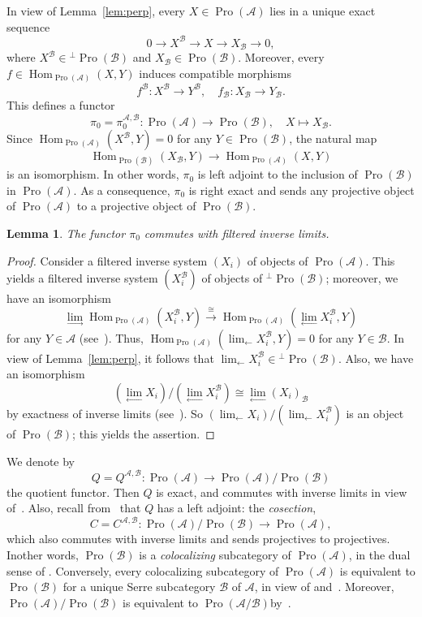 \documentclass[11pt]{article}
\newtheorem{lemm}[theo]{Lemma}
\theoremstyle{definition}
\numberwithin{equation}{section}
\newcommand\cA{{\mathcal A}}
\newcommand\cB{{\mathcal B}}
\DeclareMathOperator{\Hom}{Hom}
\DeclareMathOperator{\Pro}{Pro}
\theoremstyle{remark}
\begin{document}
In view of Lemma~\ref{lem:perp}, every $X \in \Pro(\cA)$ lies in a unique exact sequence
\begin{equation}\label{eqn:exact}
0 \longrightarrow X^{\cB} \longrightarrow X \longrightarrow X_{\cB} \longrightarrow 0,
\end{equation}
where $X^{\cB} \in {^{\perp}\Pro(\cB)}$ and $X_{\cB} \in \Pro(\cB)$. Moreover, every $f \in \Hom_{\Pro(\cA)}(X,Y)$ induces compatible morphisms
\[
f^{\cB} : X^{\cB} \longrightarrow Y^{\cB}, \quad f_{\cB} : X_{\cB} \longrightarrow Y_{\cB}.
\]
This defines a functor
\[
\pi_0 = \pi_0^{\cA, \cB} : \Pro(\cA) \longrightarrow \Pro(\cB), \quad X \longmapsto X_{\cB}.
\]
Since $\Hom_{\Pro(\cA)}(X^{\cB}, Y) = 0$ for any $Y \in \Pro(\cB)$, the natural map
\[
\Hom_{\Pro(\cB)}(X_{\cB},Y) \longrightarrow
\Hom_{\Pro(\cA)}(X,Y)
\]
is an isomorphism. In other words, $\pi_0$ is left adjoint to the inclusion of $\Pro(\cB)$ in $\Pro(\cA)$. As a consequence, $\pi_0$ is right exact and sends any projective object of $\Pro(\cA)$ to a projective object of $\Pro(\cB)$.

\begin{lemm}\label{lem:com}
The functor $\pi_0$ commutes with filtered inverse limits.
\end{lemm}

\begin{proof}
Consider a filtered inverse system $(X_i)$ of objects of $\Pro(\cA)$. This yields a filtered inverse system $(X_i^{\cB})$ of objects of ${^{\perp}\Pro(\cB)}$; moreover, we have an isomorphism
\[
\lim_{\to} \Hom_{\Pro(\cA)}(X_i^{\cB},Y)
\stackrel{\cong}{\longrightarrow}
\Hom_{\Pro(\cA)}(\lim_{\leftarrow} X_i^{\cB},Y)
\]
for any $Y \in \cA$ (see~\cite[V.2.3.3]{DG}). Thus, $\Hom_{\Pro(\cA)}(\lim_{\leftarrow} X_i^{\cB},Y) = 0$ for any $Y \in \cB$. In view of Lemma~\ref{lem:perp}, it follows that $\lim_{\leftarrow} X_i^{\cB} \in {^{\perp}\Pro(\cB)}$. Also, we have an isomorphism
\[
(\lim_{\leftarrow} X_i)/ (\lim_{\leftarrow} X_i^{\cB})
\cong \lim_{\leftarrow} (X_i)_{\cB}
\]
by exactness of inverse limits (see~\cite[V.2.2]{DG}). So $(\lim_{\leftarrow} X_i)/ (\lim_{\leftarrow} X_i^{\cB})$ is an object of $\Pro(\cB)$; this yields the assertion.
\end{proof}

We denote by
\[
Q = Q^{\cA,\cB} : \Pro(\cA) \longrightarrow \Pro(\cA)/\Pro(\cB)
\]
the quotient functor. Then $Q$ is exact, and commutes with inverse limits in view of~\cite[III.4.Prop.~9]{Gabriel}. Also, recall from~\cite[III.4.Prop.~8, Cor.~1]{Gabriel} that $Q$ has a left adjoint: the \emph{cosection},
\[
C = C^{\cA,\cB} : \Pro(\cA)/\Pro(\cB) \longrightarrow \Pro(\cA),
\]
which also commutes with inverse limits and sends projectives to projectives. In\linebreak other words, $\Pro(\cB)$ is a \emph{colocalizing} subcategory of $\Pro(\cA)$, in the dual sense of \cite[III.2]{Gabriel}. Conversely, every colocalizing subcategory of $\Pro(\cA)$ is equivalent to $\Pro(\cB)$ for a unique Serre subcategory $\cB$ of $\cA$, in view of \cite[III.4.Prop.~10]{Gabriel} and~\cite[Rem.~2.13]{Br17b}. Moreover, $\Pro(\cA)/\Pro(\cB)$ is equivalent to $\Pro(\cA/\cB)$\linebreak by~\cite[Prop.~2.12]{Br17b}.
\end{document}
